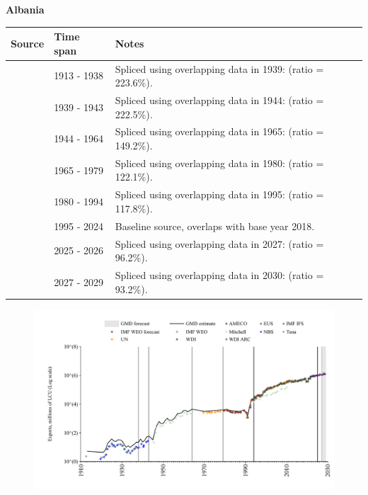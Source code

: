 \documentclass[12pt,a4paper,landscape]{article}
\begin{document}
\begin{adjustbox}{max totalsize={\paperwidth}{\paperheight},center}
\begin{minipage}[t][\textheight][t]{\textwidth}
\vspace*{0.5cm}
{}
\begin{center}
{\Large\bfseries Albania}
\end{center}
\vspace{0.5cm}
\begin{table}[H]
\centering
\small
\begin{tabular}{|l|l|l|}
\hline
\textbf{Source} & \textbf{Time span} & \textbf{Notes} \\
\hline
\rowcolor{white}\cite{Tena}& 1913 - 1938 &Spliced using overlapping data in 1939: (ratio = 223.6\%).\\
\rowcolor{lightgray}\cite{NBS}& 1939 - 1943 &Spliced using overlapping data in 1944: (ratio = 222.5\%).\\
\rowcolor{white}\cite{Mitchell}& 1944 - 1964 &Spliced using overlapping data in 1965: (ratio = 149.2\%).\\
\rowcolor{lightgray}\cite{UN}& 1965 - 1979 &Spliced using overlapping data in 1980: (ratio = 122.1\%).\\
\rowcolor{white}\cite{WDI}& 1980 - 1994 &Spliced using overlapping data in 1995: (ratio = 117.8\%).\\
\rowcolor{lightgray}\cite{EUS}& 1995 - 2024 &Baseline source, overlaps with base year 2018.\\
\rowcolor{white}\cite{AMECO}& 2025 - 2026 &Spliced using overlapping data in 2027: (ratio = 96.2\%).\\
\rowcolor{lightgray}\cite{IMF_WEO_forecast}& 2027 - 2029 &Spliced using overlapping data in 2030: (ratio = 93.2\%).\\
\hline
\end{tabular}
\end{table}
\begin{figure}[H]
\centering
\includegraphics[width=\textwidth,height=0.6\textheight,keepaspectratio]{graphs/ALB_exports.pdf}
\end{figure}
\end{minipage}
\end{adjustbox}
\end{document}
